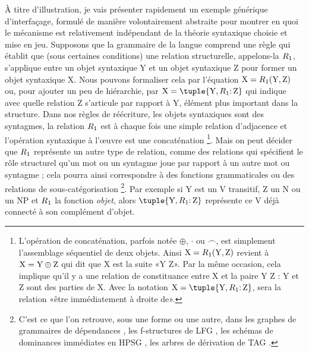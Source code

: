 À titre d'illustration, je vais présenter rapidement un exemple générique d'interfaçage, formulé de manière volontairement abstraite pour montrer en quoi le mécanisme est relativement  indépendant de la théorie syntaxique choisie et mise en jeu.  
Supposons que la grammaire de la langue comprend une règle qui établit que (sous certaines conditions) une relation structurelle, appelons-la $R_{1}$, s'applique entre un objet syntaxique Y et un objet syntaxique Z pour former un objet syntaxique X.  Nous pouvons formaliser cela par l'équation $\text X = R_{1}(\text Y,\text Z)$ ou, pour ajouter un peu de hiérarchie, par $\text X = \tuple{\text Y,\relstruc1\mathpunct{:}\text Z}$ qui indique avec quelle relation Z s'articule par rapport à Y, élément plus important dans la structure. 
Dans nos règles de réécriture, les objets syntaxiques sont des syntagmes, la relation $R_{1}$ est à chaque fois une simple relation d'adjacence et l'opération syntaxique à l'œuvre est une concaténation%
\footnote{L'opération de concaténation, parfois notée $\oplus$, $\cdot$ ou $\mathbin{\smallfrown}$, est simplement l'assemblage séquentiel de deux objets. Ainsi $\text X = R_{1}(\text Y,\text Z)$ revient à $\text X = \text Y\oplus\text Z$ qui dit que X est la suite «Y Z». Par la même occasion, cela implique qu'il y a une relation de constituance entre X et la paire Y Z : Y et Z sont des parties de X. Avec la notation $\text X = \tuple{\text Y,\relstruc1\mathpunct{:}\text Z}$,  sera la relation «être immédiatement à droite de».}.
Mais on peut décider que $R_{1}$ représente un autre type de relation, comme des relations qui spécifient le rôle structurel qu'un mot ou un syntagme joue par rapport à un autre mot ou syntagme ; cela pourra ainsi correspondre à des fonctions grammaticales ou des relations de sous-catégorisation%
\footnote{C'est ce que l'on retrouve, sous une forme ou une autre, dans les graphes de grammaires de dépendances \citep{Tesniere:59}, les f-structures de LFG \citep[,][]{Bresnan:82e}, les schémas de dominances immédiates en HPSG \citep[,][]{PolSag:94}, les arbres de dérivation de TAG \citep[,][]{Jsh:87}.}. 
Par exemple si Y est un V transitif, Z un N ou un NP et $R_{1}$ la fonction \emph{objet}, alors $\tuple{\text Y,\relstruc1\mathpunct{:}\text Z}$ représente ce V déjà connecté à son complément d'objet. 
